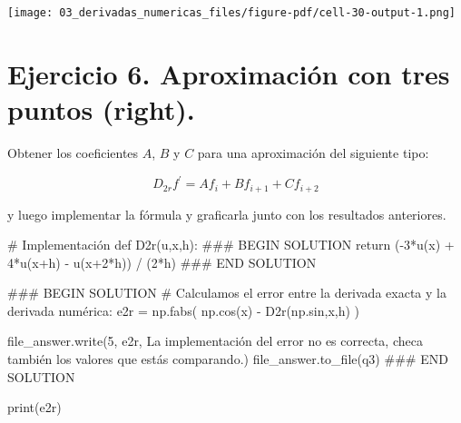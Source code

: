 \documentclass[
  letterpaper,
  DIV=11,
  numbers=noendperiod]{scrreprt}
\newenvironment{Shaded}{\begin{snugshade}}{\end{snugshade}}
\newcommand{\BuiltInTok}[1]{\textcolor[rgb]{0.00,0.23,0.31}{#1}}
\newcommand{\CommentTok}[1]{\textcolor[rgb]{0.37,0.37,0.37}{#1}}
\newcommand{\ControlFlowTok}[1]{\textcolor[rgb]{0.00,0.23,0.31}{#1}}
\newcommand{\DecValTok}[1]{\textcolor[rgb]{0.68,0.00,0.00}{#1}}
\newcommand{\KeywordTok}[1]{\textcolor[rgb]{0.00,0.23,0.31}{#1}}
\newcommand{\NormalTok}[1]{\textcolor[rgb]{0.00,0.23,0.31}{#1}}
\newcommand{\OperatorTok}[1]{\textcolor[rgb]{0.37,0.37,0.37}{#1}}
\newcommand{\RegionMarkerTok}[1]{\textcolor[rgb]{0.00,0.23,0.31}{#1}}
\newcommand{\StringTok}[1]{\textcolor[rgb]{0.13,0.47,0.30}{#1}}
\begin{document}
\texttt{[image: 03\_derivadas\_numericas\_files/figure-pdf/cell-30-output-1.png]}

\section{Ejercicio 6. Aproximación con tres puntos
(right).}\label{ejercicio-6.-aproximaciuxf3n-con-tres-puntos-right.}

Obtener los coeficientes \(A\), \(B\) y \(C\) para una aproximación del
siguiente tipo:

\[
D_{2r} f^\prime = A f_i + B f_{i+1} + C f_{i+2}
\]

y luego implementar la fórmula y graficarla junto con los resultados
anteriores.

\begin{Shaded}
\begin{Highlighting}[]
\CommentTok{\# Implementación}
\KeywordTok{def}\NormalTok{ D2r(u,x,h):}
    \CommentTok{\#\#\# }\RegionMarkerTok{BEGIN}\CommentTok{ SOLUTION}
    \ControlFlowTok{return}\NormalTok{ (}\OperatorTok{{-}}\DecValTok{3}\OperatorTok{*}\NormalTok{u(x) }\OperatorTok{+} \DecValTok{4}\OperatorTok{*}\NormalTok{u(x}\OperatorTok{+}\NormalTok{h) }\OperatorTok{{-}}\NormalTok{ u(x}\OperatorTok{+}\DecValTok{2}\OperatorTok{*}\NormalTok{h)) }\OperatorTok{/}\NormalTok{ (}\DecValTok{2}\OperatorTok{*}\NormalTok{h)}
    \CommentTok{\#\#\# }\RegionMarkerTok{END}\CommentTok{ SOLUTION}
\end{Highlighting}
\end{Shaded}

\begin{Shaded}
\begin{Highlighting}[]
\CommentTok{\#\#\# }\RegionMarkerTok{BEGIN}\CommentTok{ SOLUTION}
\CommentTok{\# Calculamos el error entre la derivada exacta y la derivada numérica:}
\NormalTok{e2r }\OperatorTok{=}\NormalTok{ np.fabs( np.cos(x) }\OperatorTok{{-}}\NormalTok{ D2r(np.sin,x,h) )}

\NormalTok{file\_answer.write(}\StringTok{\textquotesingle{}5\textquotesingle{}}\NormalTok{, e2r, }\StringTok{\textquotesingle{}La implementación del error no es correcta, checa también los valores que estás comparando.\textquotesingle{}}\NormalTok{)}
\NormalTok{file\_answer.to\_file(}\StringTok{\textquotesingle{}q3\textquotesingle{}}\NormalTok{)}
\CommentTok{\#\#\# }\RegionMarkerTok{END}\CommentTok{ SOLUTION}

\BuiltInTok{print}\NormalTok{(e2r)}
\end{Highlighting}
\end{Shaded}
\end{document}
